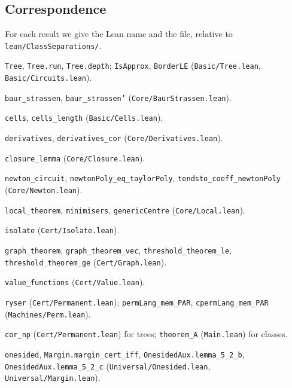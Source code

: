 \subsection{Correspondence}

For each result we give the Lean name and the file, relative to \texttt{lean/ClassSeparations/}.

\begin{description}[leftmargin=1.6em,itemsep=1pt,font=\normalfont\bfseries]
\item[\Cref{def:tree,def:border}] \texttt{Tree}, \texttt{Tree.run}, \texttt{Tree.depth}; \texttt{IsApprox}, \texttt{BorderLE} (\texttt{Basic/Tree.lean}, \texttt{Basic/Circuits.lean}).
\item[\Cref{thm:baurstrassen}] \texttt{baur\_strassen}, \texttt{baur\_strassen'} (\texttt{Core/BaurStrassen.lean}).
\item[\Cref{lem:cells}] \texttt{cells}, \texttt{cells\_length} (\texttt{Basic/Cells.lean}).
\item[\Cref{lem:derivatives,cor:derivatives}] \texttt{derivatives}, \texttt{derivatives\_cor} (\texttt{Core/Derivatives.lean}).
\item[\Cref{lem:closure}] \texttt{closure\_lemma} (\texttt{Core/Closure.lean}).
\item[\Cref{lem:newton}] \texttt{newton\_circuit}, \texttt{newtonPoly\_eq\_taylorPoly}, \texttt{tendsto\_coeff\_newtonPoly} (\texttt{Core/Newton.lean}).
\item[\Cref{thm:local,lem:minimisers,lem:genericcentre}] \texttt{local\_theorem}, \texttt{minimisers}, \texttt{genericCentre} (\texttt{Core/Local.lean}).
\item[\Cref{lem:isolate}] \texttt{isolate} (\texttt{Cert/Isolate.lean}).
\item[\Cref{thm:graph,rem:several,thm:threshold}] \texttt{graph\_theorem}, \texttt{graph\_theorem\_vec}, \texttt{threshold\_theorem\_le}, \texttt{threshold\_theorem\_ge} (\texttt{Cert/Graph.lean}).
\item[\Cref{prop:value}] \texttt{value\_functions} (\texttt{Cert/Value.lean}).
\item[\Cref{lem:ryser}] \texttt{ryser} (\texttt{Cert/Permanent.lean}); \texttt{permLang\_mem\_PAR}, \texttt{cpermLang\_mem\_PAR} (\texttt{Machines/Perm.lean}).
\item[\Cref{cor:np}] \texttt{cor\_np} (\texttt{Cert/Permanent.lean}) for trees; \texttt{theorem\_A} (\texttt{Main.lean}) for classes.
\item[\Cref{thm:onesided,lem:margin}] \texttt{onesided}, \texttt{Margin.margin\_cert\_iff}, \texttt{OnesidedAux.lemma\_5\_2\_b}, \texttt{OnesidedAux.lemma\_5\_2\_c} (\texttt{Universal/Onesided.lean}, \texttt{Universal/Margin.lean}).

\end{description}
